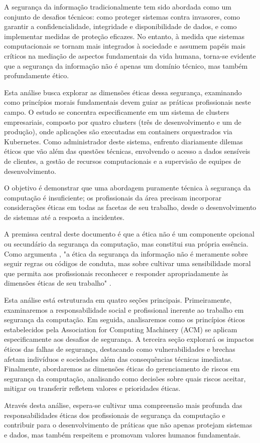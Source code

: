 A segurança da informação tradicionalmente tem sido abordada como um conjunto de desafios técnicos: como proteger sistemas contra invasores, como garantir a confidencialidade, integridade e disponibilidade de dados, e como implementar medidas de proteção eficazes. No entanto, à medida que sistemas computacionais se tornam mais integrados à sociedade e assumem papéis mais críticos na mediação de aspectos fundamentais da vida humana, torna-se evidente que a segurança da informação não é apenas um domínio técnico, mas também profundamente ético.

Esta análise busca explorar as dimensões éticas dessa segurança, examinando como princípios morais fundamentais devem guiar as práticas profissionais neste campo. O estudo se concentra especificamente em um sistema de clusters empresariais, composto por quatro clusters (três de desenvolvimento e um de produção), onde aplicações são executadas em containers orquestrados via Kubernetes. Como administrador deste sistema, enfrento diariamente dilemas éticos que vão além das questões técnicas, envolvendo o acesso a dados sensíveis de clientes, a gestão de recursos computacionais e a supervisão de equipes de desenvolvimento.

O objetivo é demonstrar que uma abordagem puramente técnica à segurança da computação é insuficiente; os profissionais da área precisam incorporar considerações éticas em todas as facetas de seu trabalho, desde o desenvolvimento de sistemas até a resposta a incidentes.

A premissa central deste documento é que a ética não é um componente opcional ou secundário da segurança da computação, mas constitui sua própria essência. Como argumenta \citeauthor{spinello2013cyberethics}, "a ética da segurança da informação não é meramente sobre seguir regras ou códigos de conduta, mas sobre cultivar uma sensibilidade moral que permita aos profissionais reconhecer e responder apropriadamente às dimensões éticas de seu trabalho" \cite{spinello2013cyberethics}.

Esta análise está estruturada em quatro seções principais. Primeiramente, examinaremos a responsabilidade social e profissional inerente ao trabalho em segurança da computação. Em seguida, analisaremos como os princípios éticos estabelecidos pela Association for Computing Machinery (ACM) se aplicam especificamente aos desafios de segurança. A terceira seção explorará os impactos éticos das falhas de segurança, destacando como vulnerabilidades e brechas afetam indivíduos e sociedades além das consequências técnicas imediatas. Finalmente, abordaremos as dimensões éticas do gerenciamento de riscos em segurança da computação, analisando como decisões sobre quais riscos aceitar, mitigar ou transferir refletem valores e prioridades éticas.

Através desta análise, espera-se cultivar uma compreensão mais profunda das responsabilidades éticas dos profissionais de segurança da computação e contribuir para o desenvolvimento de práticas que não apenas protejam sistemas e dados, mas também respeitem e promovam valores humanos fundamentais. 